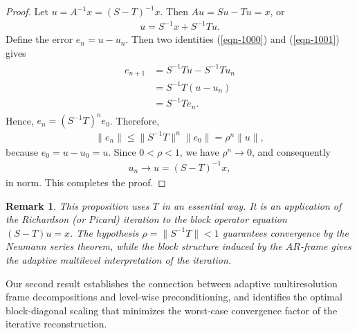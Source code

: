 \documentclass[12pt,titlepage]{amsart}
\newtheorem{rem}[thm]{Remark}
\theoremstyle{definition}
\theoremstyle{remark}
\begin{document}
\begin{proof}
Let $u=A^{-1}x=(S-T)^{-1}x$. Then $Au=Su-Tu=x$, or
\begin{eqnarray} \label{eqn-1001}
u=S^{-1}x+S^{-1}Tu.
\end{eqnarray}
Define the error $e_n=u-u_n$. Then two identities (\ref{eqn-1000})
and (\ref{eqn-1001}) gives
\begin{eqnarray*}
\begin{aligned} e_{n+1} &=
S^{-1}Tu-S^{-1}Tu_n\\ &= S^{-1}T(u-u_n)\\ &= S^{-1}Te_n.
\end{aligned}
\end{eqnarray*}
Hence, $e_n=(S^{-1}T)^ne_0$. Therefore,
\begin{eqnarray*}
\|e_n\| \le \|S^{-1}T\|^n\|e_0\| = \rho^n\|u\|,
\end{eqnarray*}
because $e_0=u-u_0=u$. Since $0<\rho<1$, we have
$\rho^n\longrightarrow0$, and consequently
\begin{eqnarray*}
u_n\longrightarrow u=(S-T)^{-1}x,
\end{eqnarray*}
in norm. This completes the proof.
\end{proof}
\begin{rem}
This proposition uses $T$ in an essential way. It is an
application of the Richardson (or Picard) iteration
\cite{Richard,Yousef} to the block operator equation $(S-T)u=x$.
The hypothesis $\rho=\|S^{-1}T\|<1$ guarantees convergence by the
Neumann series theorem, while the block structure induced by the
$AR$-frame gives the adaptive multilevel interpretation of the
iteration.
\end{rem}

Our second result establishes the connection between adaptive
multiresolution frame decompositions and level-wise
preconditioning, and identifies the optimal block-diagonal scaling
that minimizes the worst-case convergence factor of the iterative
reconstruction.
\end{document}
